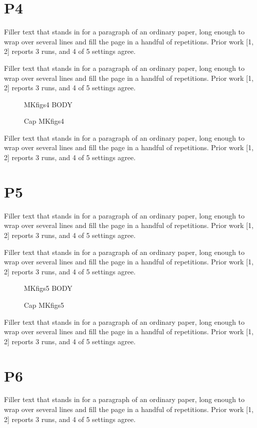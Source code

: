 \documentclass[titlepage]{article}
\begin{document}
\newpage\section{P4}
Filler text that stands in for a paragraph of an ordinary paper, long enough to wrap over several lines and fill the page in a handful of repetitions. Prior work [1, 2] reports 3 runs, and 4 of 5 settings agree.\par
Filler text that stands in for a paragraph of an ordinary paper, long enough to wrap over several lines and fill the page in a handful of repetitions. Prior work [1, 2] reports 3 runs, and 4 of 5 settings agree.\par
\begin{figure}[h]\centering MKfigs4 BODY\caption{Cap MKfigs4}\label{fig:s4}\end{figure}
Filler text that stands in for a paragraph of an ordinary paper, long enough to wrap over several lines and fill the page in a handful of repetitions. Prior work [1, 2] reports 3 runs, and 4 of 5 settings agree.\par
\newpage\section{P5}
Filler text that stands in for a paragraph of an ordinary paper, long enough to wrap over several lines and fill the page in a handful of repetitions. Prior work [1, 2] reports 3 runs, and 4 of 5 settings agree.\par
Filler text that stands in for a paragraph of an ordinary paper, long enough to wrap over several lines and fill the page in a handful of repetitions. Prior work [1, 2] reports 3 runs, and 4 of 5 settings agree.\par
\begin{figure}[h]\centering MKfigs5 BODY\caption{Cap MKfigs5}\label{fig:s5}\end{figure}
Filler text that stands in for a paragraph of an ordinary paper, long enough to wrap over several lines and fill the page in a handful of repetitions. Prior work [1, 2] reports 3 runs, and 4 of 5 settings agree.\par
\newpage\section{P6}
Filler text that stands in for a paragraph of an ordinary paper, long enough to wrap over several lines and fill the page in a handful of repetitions. Prior work [1, 2] reports 3 runs, and 4 of 5 settings agree.\par
\end{document}
